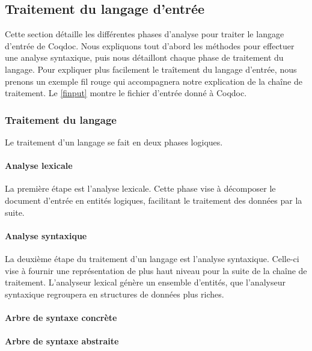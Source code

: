 \documentclass[a4paper, 11pt]{report}
\begin{document}
    \subsection{Traitement du langage d'entrée}
    Cette section détaille les différentes phases d'analyse pour traiter le
    langage d'entrée de Coqdoc. Nous expliquons tout d'abord les méthodes
    pour effectuer une analyse syntaxique, puis nous détaillont chaque phase
    de traitement du langage.
    Pour expliquer plus facilement le traîtement du langage d'entrée, nous
    prenons un exemple fil rouge qui accompagnera notre explication de la
    chaîne de traitement. Le \cref{finput} montre le fichier d'entrée
    donné à Coqdoc.
    

    \subsubsection{Traitement du langage}
    Le traitement d'un langage se fait en deux phases logiques.
    \paragraph{Analyse lexicale}
      La première étape est l'analyse lexicale. Cette phase vise à décomposer
      le document d'entrée en entités logiques, facilitant le traitement
      des données par la suite.
    \paragraph{Analyse syntaxique}
      La deuxième étape du traitement d'un langage est l'analyse syntaxique.
      Celle-ci vise à fournir une représentation de plus haut niveau pour
      la suite de la chaîne de traitement. L'analyseur lexical génère un
      ensemble d'entités, que l'analyseur syntaxique regroupera en structures
      de données plus riches.
      \paragraph{Arbre de syntaxe concrète}
      \paragraph{Arbre de syntaxe abstraite}
\end{document}
